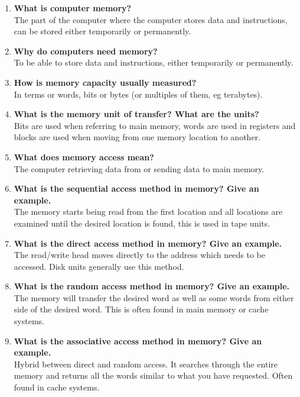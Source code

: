 
\begin{enumerate}
    \item \textbf{What is computer memory?}\\
    The part of the computer where the computer stores data and instructions, can be stored either temporarily or permanently.
    \item \textbf{Why do computers need memory?}\\
    To be able to store data and instructions, either temporarily or permanently.
    \item \textbf{How is memory capacity usually measured?}\\
    In terms or words, bits or bytes (or multiples of them, eg terabytes).
    \item \textbf{What is the memory unit of transfer? What are the units?}\\
    Bits are used when referring to main memory, words are used in registers and blocks are used when moving from one memory location to another.
    \item \textbf{What does memory access mean?}\\
    The computer retrieving data from or sending data to main memory. 
    \item \textbf{What is the sequential access method in memory? Give an example.}\\
    The memory starts being read from the first location and all locations are examined until the desired location is found, this is used in tape units.
    \item \textbf{What is the direct access method in memory? Give an example.}\\
    The read/write head moves directly to the address which needs to be accessed. Disk units generally use this method.
    \item \textbf{What is the random access method in memory? Give an example.}\\
    The memory will transfer the desired word as well as some words from either side of the desired word. This is often found in main memory or cache systems.
    \item \textbf{What is the associative access method in memory? Give an example.}\\
    Hybrid between direct and random access. It searches through the entire memory and returns all the words similar to what you have requested. Often found in cache systems.

\end{enumerate}
